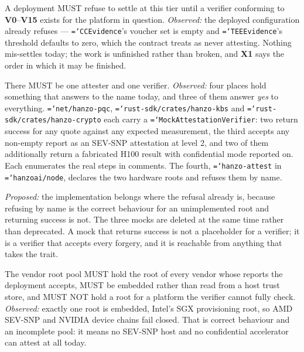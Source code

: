 \documentclass[11pt,a4paper]{article}
\newcommand{\code}[1]{\texttt{\hyphenchar\font=`\-\relax #1}}
\newcommand{\req}[1]{\textbf{#1}}
\begin{document}
\begin{description}[leftmargin=1.6em]
\item[\req{X1}] A deployment MUST refuse to settle at this tier until a verifier
conforming to \req{V0}--\req{V15} exists for the platform in question.
\emph{Observed:} the deployed configuration already refuses --- \code{CCEvidence}'s
voucher set is empty and \code{TEEEvidence}'s threshold defaults to zero, which the
contract treats as never attesting. Nothing mis-settles today; the work is
unfinished rather than broken, and \req{X1} says the order in which it may be
finished.

\item[\req{X2}] There MUST be one attester and one verifier. \emph{Observed:} four
places hold something that answers to the name today, and three of them answer
\emph{yes} to everything. \code{net/hanzo-pqc}, \code{rust-sdk/crates/hanzo-kbs} and
\code{rust-sdk/crates/hanzo-crypto} each carry a \code{MockAttestationVerifier}:
two return success for any quote against any expected measurement, the third
accepts any non-empty report as an SEV-SNP attestation at level 2, and two of them
additionally return a fabricated H100 result with confidential mode reported on. Each
enumerates the real steps in comments. The fourth, \code{hanzo-attest} in
\code{hanzoai/node}, declares the two hardware roots and refuses them by name.

\emph{Proposed:} the implementation belongs where the refusal already is, because
refusing by name is the correct behaviour for an unimplemented root and returning
success is not. The three mocks are deleted at the same time rather than deprecated.
A mock that returns success is not a placeholder for a verifier; it is a verifier
that accepts every forgery, and it is reachable from anything that takes the trait.

\item[\req{X3}] The vendor root pool MUST hold the root of every vendor whose
reports the deployment accepts, MUST be embedded rather than read from a host trust
store, and MUST NOT hold a root for a platform the verifier cannot fully check.
\emph{Observed:} exactly one root is embedded, Intel's SGX provisioning root, so
AMD SEV-SNP and NVIDIA device chains fail closed. That is correct behaviour and an
incomplete pool: it means no SEV-SNP host and no confidential accelerator can attest
at all today.
\end{description}

\end{document}
